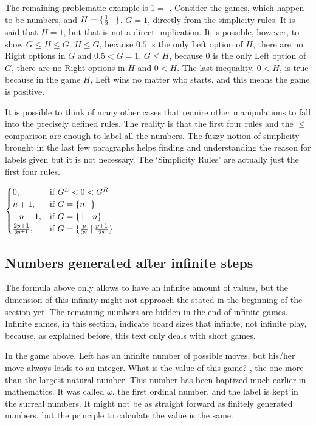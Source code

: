 The remaining problematic example is $1 =$ . Consider the games, which happen to be numbers,  and $H = \mbox{$\{\frac{1}{2}\:|\:\}$}$. $G = 1$, directly from the simplicity rules. It is said that $H = 1$, but that is not a direct implication. It is possible, however, to show $G \leq H \leq G$. $H \leq G$, because $0.5$ is the only Left option of $H$, there are no Right options in $G$ and $0.5 < G = 1$. $G \leq H$, because $0$ is the only Left option of $G$, there are no Right options in $H$ and $0 < H$. The last inequality, $0 < H$, is true because in the game $H$, Left wins no matter who starts, and this means the game is positive.

It is possible to think of many other cases that require other manipulations to fall into the precisely defined rules. The reality is that the first four rules and the $\leq$ comparison are enough to label all the numbers. The fuzzy notion of simplicity brought in the last few paragraphs helps finding and understanding the reason for labels given but it is not necessary. The `Simplicity Rules' are actually just the first four rules.

\begin{center}
	\Gm{ =} 
	$
	\begin{cases}
		0, &\text{if } G^L < 0 < G^R\\
		n+1, &\text{if } \mbox{$G= \mbox{$\{n\:|\:\}$}$}\\
		-n-1, &\text{if } \mbox{$G= \mbox{$\{\:|\:{-}n\}$}$}\\
		\frac{2p + 1}{2^{q+1}}, &\text{if } \mbox{$G= \mbox{$\{\frac{p}{2^q}\:|\: \frac{p+1}{2^q}\}$}$}
	\end{cases}
	$
\end{center}

\subsection*{Numbers generated after infinite steps}

The formula above only allows \Gm{} to have an infinite amount of values, but the dimension of this infinity might not approach the stated in the beginning of the section yet. The remaining numbers are hidden in the end of infinite games. Infinite games, in this section, indicate board sizes that infinite, not infinite play, because, as explained before, this text only deals with short games. 



In the game above, Left has an infinite number of possible moves, but his/her move always leads to an integer. What is the value of this game? , the one more than the largest natural number. This number has been baptized much earlier in mathematics. It was called $\omega$, the first ordinal number, and the label is kept in the surreal numbers. It might not be as straight forward as finitely generated numbers, but the principle to calculate the value is the same.

